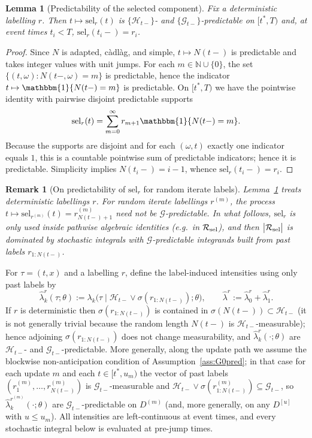 \documentclass{statsoc}
\newtheorem{lemma}[lemma]{Lemma}
\newtheorem{remark}[remark]{Remark}
\newcommand{\1}{\mathbbm{1}}
\newcommand{\bbN}{\mathbb{N}}
\begin{document}
\begin{lemma}[Predictability of the selected component]\label{lem:sel-predictable}
Fix a deterministic labelling $r$. Then $t\mapsto \mathrm{sel}_r(t)$ is $\{\mathcal H_{t-}\}$- and $\{\mathcal G_{t-}\}$-predictable on $[t^\ast,T)$ and, at event times $t_i<T$, $\mathrm{sel}_r(t_i-)=r_i$.
\end{lemma}

\begin{proof}
Since $N$ is adapted, c\`adl\`ag, and simple, $t\mapsto N(t-)$ is predictable and takes integer values with unit jumps. For each $m\in\bbN\cup\{0\}$, the set $\{(t,\omega):N(t-,\omega)=m\}$ is predictable, hence the indicator $t\mapsto \1\{N(t-)=m\}$ is predictable. On $[t^\ast,T)$ we have the pointwise identity with pairwise disjoint predictable supports
\[
\mathrm{sel}_r(t)=\sum_{m=0}^\infty r_{m+1} \1\{N(t-)=m\}.
\]
Because the supports are disjoint and for each $(\omega,t)$ exactly one indicator equals $1$, this is a countable pointwise sum of predictable indicators; hence it is predictable. Simplicity implies $N(t_i-)=i-1$, whence $\mathrm{sel}_r(t_i-)=r_i$.
\end{proof}

\begin{remark}[On predictability of $\mathrm{sel}_r$ for random iterate labels]\label{rem:sel-random}
Lemma~\ref{lem:sel-predictable} treats deterministic labellings $r$. For random iterate labellings $r^{(m)}$, the process $t\mapsto \mathrm{sel}_{r^{(m)}}(t)=r^{(m)}_{N(t-)+1}$ need not be $\mathcal G$-predictable. In what follows, $\mathrm{sel}_r$ is only used inside pathwise algebraic identities (e.g.\ in $\mathcal R_{\rm sel}$),
and then $\big|\mathcal R_{\rm sel}\big|$ is dominated by stochastic integrals with $\mathcal G$-predictable integrands built from past labels $r_{1:N(t-)}$.
\end{remark}

For $\tau=(t,x)$ and a labelling $r$, define the label-induced intensities using only past labels by
\[
\widehat\lambda_k^r(\tau;\theta):=\lambda_k\!\big(\tau\mid \mathcal H_{t-}\vee\sigma(r_{1:N(t-)});\theta\big),\qquad
\widehat\lambda^r:=\widehat\lambda_0^r+\widehat\lambda_1^r.
\]
If $r$ is deterministic then $\sigma(r_{1:N(t-)})$ is contained in $\sigma(N(t-))\subset \mathcal H_{t-}$ (it is not generally trivial because the random length $N(t-)$ is $\mathcal H_{t-}$-measurable); hence adjoining $\sigma(r_{1:N(t-)})$ does not change measurability, and $\widehat\lambda_k^r(\cdot;\theta)$ are $\mathcal H_{t-}$- and $\mathcal G_{t-}$-predictable. More generally, along the update path we assume the blockwise non-anticipation condition of Assumption~\ref{ass:G0pred}; in that case for each update $m$ and each $t\in[t^\ast,u_m)$ the vector of past labels $(r^{(m)}_1,\ldots,r^{(m)}_{N(t-)})$ is $\mathcal G_{t-}$-measurable and $\mathcal H_{t-}\vee\sigma(r^{(m)}_{1:N(t-)})\subseteq\mathcal G_{t-}$, so $\widehat\lambda_k^{r^{(m)}}(\cdot;\theta)$ are $\mathcal G_{t-}$-predictable on $D^{(m)}$ (and, more generally, on any $D^{[u]}$ with $u\le u_m$).
All intensities are left-continuous at event times, and every stochastic integral below is evaluated at pre-jump times.
\end{document}
